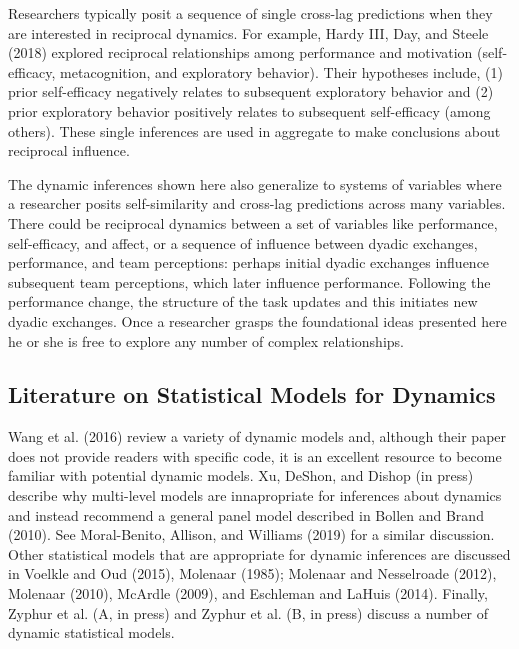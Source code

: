 \documentclass[english,,man]{apa6}
\theoremstyle{definition}
\theoremstyle{definition}
\theoremstyle{definition}
\theoremstyle{remark}
\begin{document}
Researchers typically posit a sequence of single cross-lag predictions
when they are interested in reciprocal dynamics. For example, Hardy III,
Day, and Steele (2018) explored reciprocal relationships among
performance and motivation (self-efficacy, metacognition, and
exploratory behavior). Their hypotheses include, (1) prior self-efficacy
negatively relates to subsequent exploratory behavior and (2) prior
exploratory behavior positively relates to subsequent self-efficacy
(among others). These single inferences are used in aggregate to make
conclusions about reciprocal influence.

The dynamic inferences shown here also generalize to systems of
variables where a researcher posits self-similarity and cross-lag
predictions across many variables. There could be reciprocal dynamics
between a set of variables like performance, self-efficacy, and affect,
or a sequence of influence between dyadic exchanges, performance, and
team perceptions: perhaps initial dyadic exchanges influence subsequent
team perceptions, which later influence performance. Following the
performance change, the structure of the task updates and this initiates
new dyadic exchanges. Once a researcher grasps the foundational ideas
presented here he or she is free to explore any number of complex
relationships.

\hypertarget{literature-on-statistical-models-for-dynamics}{%
\subsection{Literature on Statistical Models for
Dynamics}\label{literature-on-statistical-models-for-dynamics}}

Wang et al. (2016) review a variety of dynamic models and, although
their paper does not provide readers with specific code, it is an
excellent resource to become familiar with potential dynamic models. Xu,
DeShon, and Dishop (in press) describe why multi-level models are
innapropriate for inferences about dynamics and instead recommend a
general panel model described in Bollen and Brand (2010). See
Moral-Benito, Allison, and Williams (2019) for a similar discussion.
Other statistical models that are appropriate for dynamic inferences are
discussed in Voelkle and Oud (2015), Molenaar (1985); Molenaar and
Nesselroade (2012), Molenaar (2010), McArdle (2009), and Eschleman and
LaHuis (2014). Finally, Zyphur et al. (A, in press) and Zyphur et al.
(B, in press) discuss a number of dynamic statistical models.
\end{document}
